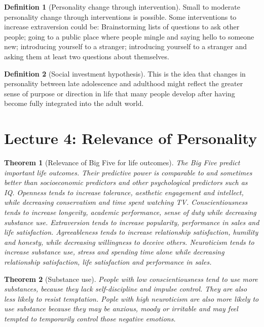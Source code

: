 \documentclass{article}
\newtheorem{theorem}{Theorem}
\theoremstyle{definition}
\newtheorem{definition}{Definition}
\theoremstyle{Solution}
\begin{document}
\begin{definition}[Personality change through intervention]
Small to moderate personality change through interventions is possible. Some interventions to increase extraversion could be: Brainstorming lists of questions to ask other people; going to a public place where people mingle and saying hello to someone new; introducing yourself to a stranger; introducing yourself to a stranger and asking them at least two questions about themselves.
\end{definition}

\begin{definition}[Social investment hypothesis]
This is the idea that changes in personality between late adolescence and adulthood might reflect the greater sense of purpose or direction in life that many people develop after having become fully integrated into the adult world.
\end{definition}

\section{Lecture 4: Relevance of Personality}

\begin{theorem}[Relevance of Big Five for life outcomes]
The Big Five predict important life outcomes. Their predictive power is comparable to and sometimes better than socioeconomic predictors and other psychological predictors such as IQ. Openness tends to increase tolerance, aesthetic engagement and intellect, while decreasing conservatism and time spent watching TV. Conscientiousness tends to increase longevity, academic performance, sense of duty while decreasing substance use. Extraversion tends to increase popularity, performance in sales and life satisfaction. Agreeableness tends to increase relationship satisfaction, humility and honesty, while decreasing willingness to deceive others. Neuroticism tends to increase substance use, stress and spending time alone while decreasing relationship satisfaction, life satisfaction and performance in sales.
\end{theorem}

\begin{theorem}[Substance use]
People with low conscientiousness tend to use more substances, because they lack self-discipline and impulse control. They are also less likely to resist temptation. Pople with high neuroticism are also more likely to use substance because they may be anxious, moody or irritable and may feel tempted to temporarily control those negative emotions.
\end{theorem}
\end{document}
